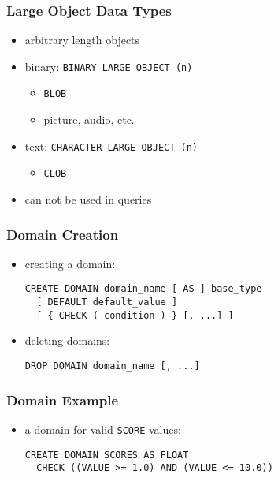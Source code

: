 \documentclass[dvipsnames]{beamer}
\theoremstyle{plain}
\begin{document}
\begin{frame}
  \frametitle{Large Object Data Types}

  \begin{itemize}
    \item arbitrary length objects

    \medskip
    \item binary: \texttt{BINARY LARGE OBJECT (n)}
    \begin{itemize}
      \item \texttt{BLOB}
      \item picture, audio, etc.
    \end{itemize}

    \item text: \texttt{CHARACTER LARGE OBJECT (n)}
    \begin{itemize}
      \item \texttt{CLOB}
    \end{itemize}

    \pause
    \bigskip
    \item can not be used in queries
  \end{itemize}
\end{frame}

\begin{frame}[fragile]
  \frametitle{Domain Creation}

  \begin{itemize}
    \item creating a domain:
    \begin{lstlisting}
CREATE DOMAIN domain_name [ AS ] base_type
  [ DEFAULT default_value ]
  [ { CHECK ( condition ) } [, ...] ]
    \end{lstlisting}

    \pause
    \item deleting domains:
    \begin{lstlisting}
DROP DOMAIN domain_name [, ...]
    \end{lstlisting}
  \end{itemize}
\end{frame}

\begin{frame}[fragile]
  \frametitle{Domain Example}

  \begin{itemize}
    \item a domain for valid \texttt{SCORE} values:
    \begin{lstlisting}
CREATE DOMAIN SCORES AS FLOAT
  CHECK ((VALUE >= 1.0) AND (VALUE <= 10.0))
    \end{lstlisting}
  \end{itemize}
\end{frame}
\end{document}
